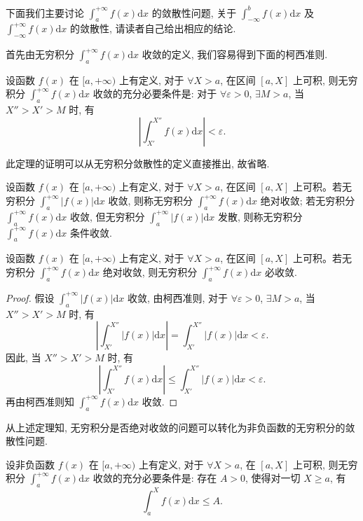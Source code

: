 下面我们主要讨论 $\int_a^{+\infty}f(x)\mathrm dx$ 的敛散性问题, 关于 $\int_{-\infty}^b f(x)\mathrm dx$ 及 $\int_{-\infty}^{+\infty}f(x)\mathrm dx$ 的敛散性, 请读者自己给出相应的结论.

首先由无穷积分 $\int_a^{+\infty}f(x)\mathrm dx$ 收敛的定义, 我们容易得到下面的柯西准则.

\begin{theorem}[{柯西准则}]\label{theorem:ma-8-2-1}
设函数 $f(x)$ 在 $[a,+\infty)$ 上有定义, 对于 $\forall X>a$, 在区间 $[a,X]$ 上可积, 则无穷积分 $\int_a^{+\infty}f(x)\mathrm dx$ 收敛的充分必要条件是: 对于 $\forall\varepsilon>0$, $\exists M>a$, 当 $X''>X'>M$ 时, 有
\[
  \left|\int_{X'}^{X''}f(x)\mathrm dx\right|<\varepsilon.
\]
\end{theorem}

此定理的证明可以从无穷积分敛散性的定义直接推出, 故省略.

\begin{definition}\label{definition:ma-8-2-1}
设函数 $f(x)$ 在 $[a,+\infty)$ 上有定义, 对于 $\forall X>a$, 在区间 $[a,X]$ 上可积。若无穷积分 $\int_a^{+\infty}|f(x)|\mathrm dx$ 收敛, 则称无穷积分 $\int_a^{+\infty}f(x)\mathrm dx$ 绝对收敛; 若无穷积分 $\int_a^{+\infty}f(x)\mathrm dx$ 收敛, 但无穷积分 $\int_a^{+\infty}|f(x)|\mathrm dx$ 发散, 则称无穷积分 $\int_a^{+\infty}f(x)\mathrm dx$ 条件收敛.
\end{definition}


\begin{theorem}\label{theorem:ma-8-2-2}
设函数 $f(x)$ 在 $[a,+\infty)$ 上有定义, 对于 $\forall X>a$, 在区间 $[a,X]$ 上可积。若无穷积分 $\int_a^{+\infty}f(x)\mathrm dx$ 绝对收敛, 则无穷积分 $\int_a^{+\infty}f(x)\mathrm dx$ 必收敛.
\end{theorem}


\begin{proof}
假设 $\int_a^{+\infty}|f(x)|\mathrm dx$ 收敛, 由柯西准则, 对于 $\forall\varepsilon>0$, $\exists M>a$, 当 $X''>X'>M$ 时, 有
\[
  \left|\int_{X'}^{X''}|f(x)|\mathrm dx\right|
  =
  \int_{X'}^{X''}|f(x)|\mathrm dx<\varepsilon.
\]
因此, 当 $X''>X'>M$ 时, 有
\[
  \left|\int_{X'}^{X''}f(x)\mathrm dx\right|
  \leq
  \int_{X'}^{X''}|f(x)|\mathrm dx<\varepsilon.
\]
再由柯西准则知 $\int_a^{+\infty}f(x)\mathrm dx$ 收敛.
\end{proof}


从上述定理知, 无穷积分是否绝对收敛的问题可以转化为非负函数的无穷积分的敛散性问题.

\begin{theorem}\label{theorem:ma-8-2-3}
设非负函数 $f(x)$ 在 $[a,+\infty)$ 上有定义, 对于 $\forall X>a$, 在 $[a,X]$ 上可积, 则无穷积分 $\int_a^{+\infty}f(x)\mathrm dx$ 收敛的充分必要条件是: 存在 $A>0$, 使得对一切 $X\geq a$, 有
\[
  \int_a^X f(x)\mathrm dx\leq A.
\]
\end{theorem}


